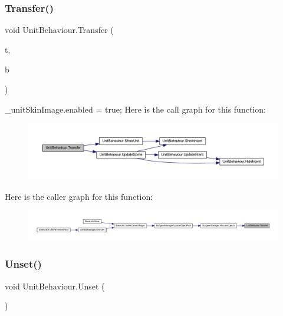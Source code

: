 \subsubsection{\texorpdfstring{Transfer()}{Transfer()}}
{\footnotesize\ttfamily void Unit\+Behaviour.\+Transfer (\begin{DoxyParamCaption}\item[{\mbox{\hyperlink{class_tile}{Tile}}}]{t,  }\item[{\mbox{\hyperlink{class_base_unit}{Base\+Unit}}}]{b }\end{DoxyParamCaption})}

\+\_\+unit\+Skin\+Image.\+enabled = true; Here is the call graph for this function\+:\nopagebreak
\begin{figure}[H]
\begin{center}
\leavevmode
\includegraphics[width=350pt]{class_unit_behaviour_a7e978454f207985987f6088c037b9c5f_cgraph}
\end{center}
\end{figure}
Here is the caller graph for this function\+:\nopagebreak
\begin{figure}[H]
\begin{center}
\leavevmode
\includegraphics[width=350pt]{class_unit_behaviour_a7e978454f207985987f6088c037b9c5f_icgraph}
\end{center}
\end{figure}
\mbox{\label{class_unit_behaviour_adf2d07785a2cc3076363ad5dd0962b9c}} 
\subsubsection{\texorpdfstring{Unset()}{Unset()}}
{\footnotesize\ttfamily void Unit\+Behaviour.\+Unset (\begin{DoxyParamCaption}{ }\end{DoxyParamCaption})}

